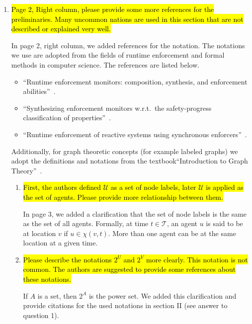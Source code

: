 \documentclass{article}[12pt]
\begin{document}
\begin{enumerate}

\item  \hl{Page 2, Right column, please provide some more references for the preliminaries. Many uncommon nations are used in this section that are not described or explained very well.}

In page 2, right column, we added references for the notation. The notations we use are adopted from the fields of runtime enforcement and formal methods in computer science. The references are listed below. 

\begin{itemize}
\item “Runtime enforcement monitors: composition, synthesis, and enforcement abilities”~\cite{Falcone2011}.
\item “Synthesizing enforcement monitors w.r.t.~the safety-progress classification  of  properties”~\cite{falconeruntime1}.
\item “Runtime enforcement of reactive systems using synchronous enforcers”~\cite{Pinisetty2016runtime}.
\end{itemize}

Additionally, for graph theoretic concepts (for example labeled graphs) we adopt the definitions and notations from the textbook``Introduction to Graph Theory''~\cite{west_introduction_2000}.

\begin{enumerate}
\item  \hl{First, the authors defined $\mathcal{U}$ as a set of node labels, later $\mathcal{U}$ is applied as the set of agents. Please provide more relationship between them.}

In page 3, we added a clarification that the set of node labels is the same as the set of all agents. %
Formally, at time $t \in \mathcal{T}$, an agent $u$ is said to be at location $v$ if $u \in \chi(v,t)$. More than one agent can be at the same location at a given time. 

\item  \hl{Please describe the notations $2^U$ and $2^V$ more clearly. This notation is not common. The authors are suggested to provide some references about these notations.}

If $A$ is a set, then $2^A$ is the power set. We added this clarification and provide citations for the used notations in section II (see answer to question 1).


\end{enumerate}
\end{enumerate}
\end{document}

